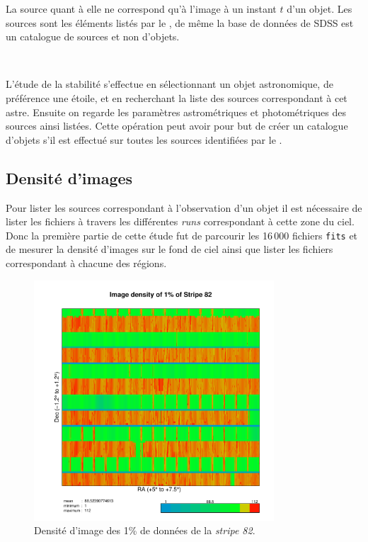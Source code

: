 La source quant à elle ne correspond qu'à l'image à un instant $t$ d'un objet. Les sources sont les éléments listés par le \stack{}, de même la base de données de SDSS est un catalogue de sources et non d'objets.

\

L'étude de la stabilité s'effectue en sélectionnant un objet astronomique, de préférence une étoile, et en recherchant la liste des sources correspondant à cet astre. Ensuite on regarde les paramètres astrométriques et photométriques des sources ainsi listées. Cette opération peut avoir pour but de créer un catalogue d'objets s'il est effectué sur toutes les sources identifiées par le \stack{}.


	\subsection{Densité d'images}

Pour lister les sources correspondant à l'observation d'un objet il est nécessaire de lister les fichiers à travers les différentes \emph{runs} correspondant à cette zone du ciel. Donc la première partie de cette étude fut de parcourir les 16\,000 fichiers \texttt{fits} et de mesurer la densité d'images sur le fond de ciel ainsi que lister les fichiers correspondant à chacune des régions.

	\begin{figure}[h]
		\centering
		\includegraphics[width=0.8\textwidth]{img/raw/density_one_percent.pdf}
		\caption[Densité d'images de la \emph{stripe 82}]{Densité d'image des 1\% de données de la \emph{stripe 82}.}
		\label{fig:dstrip82}
	\end{figure}

